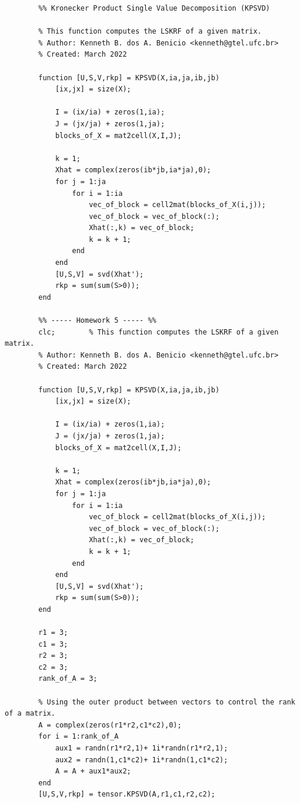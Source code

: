 \documentclass[a4paper,10pt]{article}
\begin{document}
    \begin{verbatim}
        %% Kronecker Product Single Value Decomposition (KPSVD)

        % This function computes the LSKRF of a given matrix.   
        % Author: Kenneth B. dos A. Benicio <kenneth@gtel.ufc.br>
        % Created: March 2022

        function [U,S,V,rkp] = KPSVD(X,ia,ja,ib,jb)
            [ix,jx] = size(X);
            
            I = (ix/ia) + zeros(1,ia);
            J = (jx/ja) + zeros(1,ja);
            blocks_of_X = mat2cell(X,I,J);
            
            k = 1;
            Xhat = complex(zeros(ib*jb,ia*ja),0);
            for j = 1:ja
                for i = 1:ia
                    vec_of_block = cell2mat(blocks_of_X(i,j));
                    vec_of_block = vec_of_block(:);
                    Xhat(:,k) = vec_of_block;
                    k = k + 1;
                end
            end
            [U,S,V] = svd(Xhat');
            rkp = sum(sum(S>0));
        end

        %% ----- Homework 5 ----- %%
        clc;        % This function computes the LSKRF of a given matrix.   
        % Author: Kenneth B. dos A. Benicio <kenneth@gtel.ufc.br>
        % Created: March 2022

        function [U,S,V,rkp] = KPSVD(X,ia,ja,ib,jb)
            [ix,jx] = size(X);
            
            I = (ix/ia) + zeros(1,ia);
            J = (jx/ja) + zeros(1,ja);
            blocks_of_X = mat2cell(X,I,J);
            
            k = 1;
            Xhat = complex(zeros(ib*jb,ia*ja),0);
            for j = 1:ja
                for i = 1:ia
                    vec_of_block = cell2mat(blocks_of_X(i,j));
                    vec_of_block = vec_of_block(:);
                    Xhat(:,k) = vec_of_block;
                    k = k + 1;
                end
            end
            [U,S,V] = svd(Xhat');
            rkp = sum(sum(S>0));
        end

        r1 = 3;
        c1 = 3;
        r2 = 3;
        c2 = 3;
        rank_of_A = 3;

        % Using the outer product between vectors to control the rank of a matrix.
        A = complex(zeros(r1*r2,c1*c2),0);
        for i = 1:rank_of_A
            aux1 = randn(r1*r2,1)+ 1i*randn(r1*r2,1); 
            aux2 = randn(1,c1*c2)+ 1i*randn(1,c1*c2); 
            A = A + aux1*aux2; 
        end
        [U,S,V,rkp] = tensor.KPSVD(A,r1,c1,r2,c2);


\end{verbatim}
\end{document}
